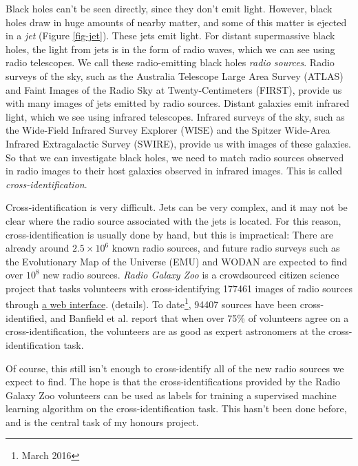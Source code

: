 \documentclass[a4paper]{article}
\begin{document}
        Black holes can't be seen directly, since they don't emit light. However, black holes draw in huge amounts of nearby matter, and some of this matter is ejected in a \emph{jet} (Figure \ref{fig-jet}). These jets emit light. For distant supermassive black holes, the light from jets is in the form of radio waves, which we can see using radio telescopes. We call these radio-emitting black holes \emph{radio sources}. Radio surveys of the sky, such as the Australia Telescope Large Area Survey (ATLAS)\cite{norris06} and Faint Images of the Radio Sky at Twenty-Centimeters (FIRST)\cite{becker95}, provide us with many images of jets emitted by radio sources. Distant galaxies emit infrared light, which we see using infrared telescopes. Infrared surveys of the sky, such as the Wide-Field Infrared Survey Explorer (WISE)\cite{wright10} and the Spitzer Wide-Area Infrared Extragalactic Survey (SWIRE)\cite{lonsdale03}, provide us with images of these galaxies. So that we can investigate black holes, we need to match radio sources observed in radio images to their host galaxies observed in infrared images. This is called \emph{cross-identification}.

        Cross-identification is very difficult. Jets can be very complex, and it may not be clear where the radio source associated with the jets is located. For this reason, cross-identification is usually done by hand\cite{banfield15}, but this is impractical: There are already around $2.5 \times 10^6$ known radio sources, and future radio surveys such as the Evolutionary Map of the Universe (EMU)\cite{norris11} and WODAN\cite{röttgering11} are expected to find over $10^8$ new radio sources\cite{banfield15}. \emph{Radio Galaxy Zoo} is a crowdsourced citizen science project that tasks volunteers with cross-identifying 177461 images of radio sources through \href{http://radio.galaxyzoo.org}{a web interface}. (details). To date\footnote{March 2016}, 94407 sources have been cross-identified, and Banfield et al.\cite{banfield15} report that when over 75\% of volunteers agree on a cross-identification, the volunteers are as good as expert astronomers at the cross-identification task.

        Of course, this still isn't enough to cross-identify all of the new radio sources we expect to find. The hope is that the cross-identifications provided by the Radio Galaxy Zoo volunteers can be used as labels for training a supervised machine learning algorithm on the cross-identification task. This hasn't been done before, and is the central task of my honours project.
\end{document}
